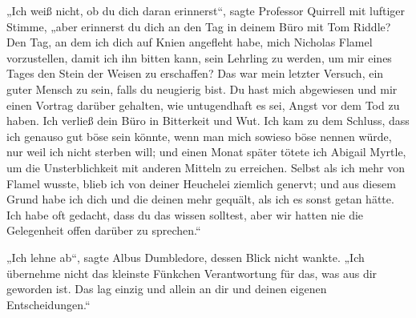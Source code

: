 „Ich weiß nicht, ob du dich daran erinnerst“, sagte Professor Quirrell mit luftiger Stimme, „aber erinnerst du dich an den Tag in deinem Büro mit Tom Riddle? Den Tag, an dem ich dich auf Knien angefleht habe, mich Nicholas Flamel vorzustellen, damit ich ihn bitten kann, sein Lehrling zu werden, um mir eines Tages den Stein der Weisen zu erschaffen? Das war mein letzter Versuch, ein guter Mensch zu sein, falls du neugierig bist. Du hast mich abgewiesen und mir einen Vortrag darüber gehalten, wie untugendhaft es sei, Angst vor dem Tod zu haben. Ich verließ dein Büro in Bitterkeit und Wut. Ich kam zu dem Schluss, dass ich genauso gut böse sein könnte, wenn man mich sowieso böse nennen würde, nur weil ich nicht sterben will; und einen Monat später tötete ich Abigail Myrtle, um die Unsterblichkeit mit anderen Mitteln zu erreichen. Selbst als ich mehr von Flamel wusste, blieb ich von deiner Heuchelei ziemlich genervt; und aus diesem Grund habe ich dich und die deinen mehr gequält, als ich es sonst getan hätte. Ich habe oft gedacht, dass du das wissen solltest, aber wir hatten nie die Gelegenheit offen darüber zu sprechen.“

„Ich lehne ab“, sagte Albus Dumbledore, dessen Blick nicht wankte. „Ich übernehme nicht das kleinste Fünkchen Verantwortung für das, was aus dir geworden ist. Das lag einzig und allein an dir und deinen eigenen Entscheidungen.“

